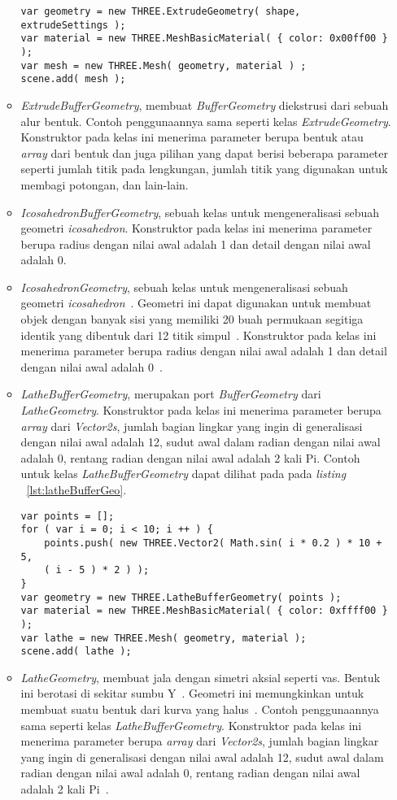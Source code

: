 \begin{itemize}
\begin{itemize}
\begin{lstlisting}[caption={Contoh penggunaan kelas {\it ExtrudeGeometry}.}, label={lst:extrudeGeo},captionpos=b]
var geometry = new THREE.ExtrudeGeometry( shape, extrudeSettings );
var material = new THREE.MeshBasicMaterial( { color: 0x00ff00 } );
var mesh = new THREE.Mesh( geometry, material ) ;
scene.add( mesh );
\end{lstlisting}
		\item {\it ExtrudeBufferGeometry}, membuat {\it BufferGeometry} diekstrusi dari sebuah alur bentuk. Contoh penggunaannya sama seperti kelas {\it ExtrudeGeometry}. Konstruktor pada kelas ini menerima parameter berupa bentuk atau {\it array} dari bentuk dan juga pilihan yang dapat berisi beberapa parameter seperti jumlah titik pada lengkungan, jumlah titik yang digunakan untuk membagi potongan, dan lain-lain.
		\item {\it IcosahedronBufferGeometry}, sebuah kelas untuk mengeneralisasi sebuah geometri {\it icosahedron}. Konstruktor pada kelas ini menerima parameter berupa radius dengan nilai awal adalah 1 dan detail dengan nilai awal adalah 0.
		\item {\it IcosahedronGeometry}, sebuah kelas untuk mengeneralisasi sebuah geometri {\it icosahedron}~\cite{threejs}. Geometri ini dapat digunakan untuk membuat objek dengan banyak sisi yang memiliki 20 buah permukaan segitiga identik yang dibentuk dari 12 titik simpul~\cite{learningThreejs}. Konstruktor pada kelas ini menerima parameter berupa radius dengan nilai awal adalah 1 dan detail dengan nilai awal adalah 0~\cite{threejs}.
		\item {\it LatheBufferGeometry}, merupakan port {\it BufferGeometry} dari {\it LatheGeometry}. Konstruktor pada kelas ini menerima parameter berupa {\it array} dari {\it Vector2s}, jumlah bagian lingkar yang ingin di generalisasi dengan nilai awal adalah 12, sudut awal dalam radian dengan nilai awal adalah 0, rentang radian dengan nilai awal adalah 2 kali Pi. Contoh untuk kelas {\it LatheBufferGeometry} dapat dilihat pada pada {\it listing} ~\ref{lst:latheBufferGeo}.
\begin{lstlisting}[caption={Contoh penggunaan kelas {\it LatheBufferGeometry}.}, label={lst:latheBufferGeo},captionpos=b]
var points = [];
for ( var i = 0; i < 10; i ++ ) {
	points.push( new THREE.Vector2( Math.sin( i * 0.2 ) * 10 + 5,
	( i - 5 ) * 2 ) );
}
var geometry = new THREE.LatheBufferGeometry( points );
var material = new THREE.MeshBasicMaterial( { color: 0xffff00 } );
var lathe = new THREE.Mesh( geometry, material );
scene.add( lathe );
\end{lstlisting}
		\item {\it LatheGeometry}, membuat jala dengan simetri aksial seperti vas. Bentuk ini berotasi di sekitar sumbu Y~\cite{threejs}. Geometri ini memungkinkan untuk membuat suatu bentuk dari kurva yang halus~\cite{learningThreejs}. Contoh penggunaannya sama seperti kelas {\it LatheBufferGeometry}. Konstruktor pada kelas ini menerima parameter berupa {\it array} dari {\it Vector2s}, jumlah bagian lingkar yang ingin di generalisasi dengan nilai awal adalah 12, sudut awal dalam radian dengan nilai awal adalah 0, rentang radian dengan nilai awal adalah 2 kali Pi~\cite{threejs}.

\end{itemize}
\end{itemize}
